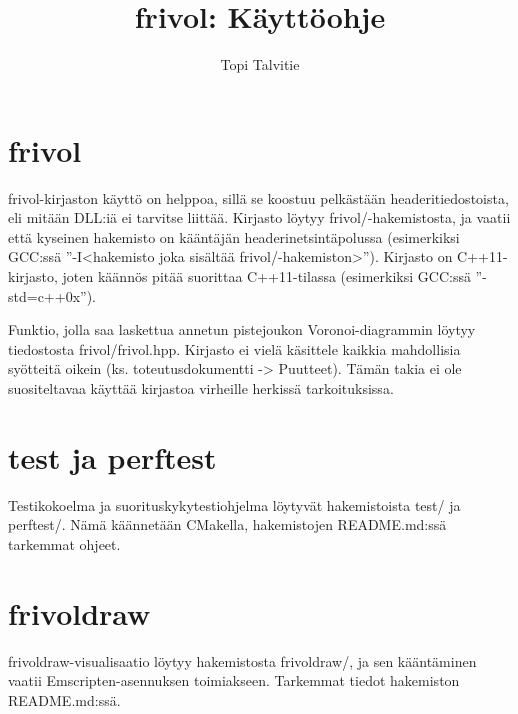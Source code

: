\documentclass[a4paper, 11pt, finnish]{article}
\author{Topi Talvitie}
\title{frivol: Käyttöohje}
\begin{document}
\maketitle

\section*{frivol}
frivol-kirjaston käyttö on helppoa, sillä se koostuu pelkästään headeritiedostoista, eli mitään DLL:iä ei tarvitse liittää. Kirjasto löytyy frivol/-hakemistosta, ja vaatii että kyseinen hakemisto on kääntäjän headerinetsintäpolussa (esimerkiksi GCC:ssä ''-I<hakemisto joka sisältää frivol/-hakemiston>''). Kirjasto on C++11-kirjasto, joten käännös pitää suorittaa C++11-tilassa (esimerkiksi GCC:ssä ''-std=c++0x'').

Funktio, jolla saa laskettua annetun pistejoukon Voronoi-diagrammin löytyy tiedostosta frivol/frivol.hpp. Kirjasto ei vielä käsittele kaikkia mahdollisia syötteitä oikein (ks. toteutusdokumentti -> Puutteet). Tämän takia ei ole suositeltavaa käyttää kirjastoa virheille herkissä tarkoituksissa.

\section*{test ja perftest}
Testikokoelma ja suorituskykytestiohjelma löytyvät hakemistoista test/ ja perftest/. Nämä käännetään CMakella, hakemistojen README.md:ssä tarkemmat ohjeet.

\section*{frivoldraw}
frivoldraw-visualisaatio löytyy hakemistosta frivoldraw/, ja sen kääntäminen vaatii Emscripten-asennuksen toimiakseen. Tarkemmat tiedot hakemiston README.md:ssä.
\end{document}
